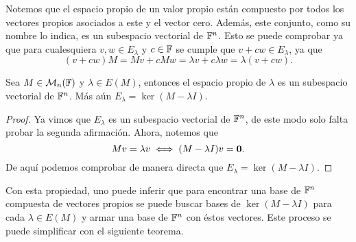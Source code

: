 Notemos que el espacio propio de un valor propio están compuesto por todos los vectores propios asociados a este y el vector cero. Además, este conjunto, como su nombre lo indica, es un subespacio vectorial de $\mathbb{F}^n$. Esto se puede comprobar ya que para cualesquiera $v,w \in E_\lambda$ y $c \in \mathbb{F}$ se cumple que $v+cw \in E_\lambda$, ya que
  \[
    (v+cw)M = Mv + cMw = \lambda v + c \lambda w = \lambda (v+cw).
  \]
\begin{prop} \label{prop:BVPDiag}
  Sea $M \in \mathcal{M}_n(\mathbb{F})$ y $\lambda \in E(M)$, entonces el espacio propio de $\lambda$ es un subespacio vectorial de $\mathbb{F}^n$. Más aún $E_\lambda = \ker(M-\lambda I)$.
\end{prop}
\begin{proof}
  Ya vimos que $E_\lambda$ es un subespacio vectorial de $\mathbb{F}^n$, de este modo solo falta probar la segunda afirmación. Ahora, notemos que 
  \[ Mv = \lambda v \iff (M-\lambda I)v = \mathbf{0}. \]
  De aquí podemos comprobar de manera directa que $E_\lambda = \ker(M-\lambda I)$.
\end{proof}

Con esta propiedad, uno puede inferir que para encontrar una base de $\mathbb{F}^n$ compuesta de vectores propios se puede buscar bases de $\ker(M-\lambda I)$ para cada $\lambda \in E(M)$ y armar una base de $\mathbb{F}^n$ con éstos vectores. Este proceso se puede simplificar con el siguiente teorema.

